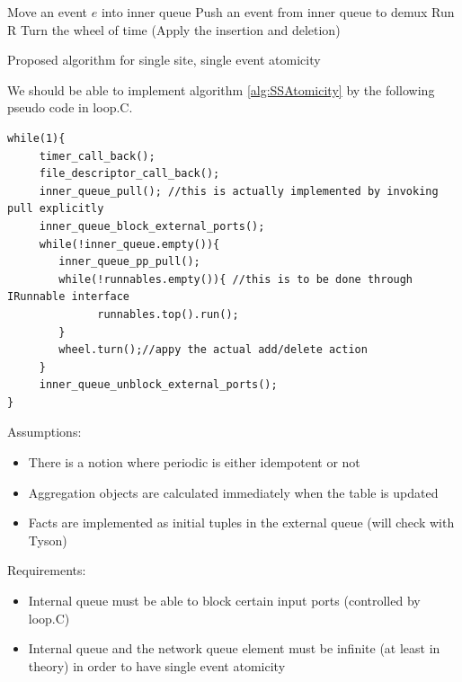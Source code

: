 \documentclass{article}
\begin{document}
\begin{algorithm}[h]
	\begin{algorithmic}
			\STATE Move an event $e$ into inner queue
				\STATE Push an event from inner queue to demux
					\STATE Run R
				\ENDWHILE
				\STATE Turn the wheel of time (Apply the insertion and deletion)
			\ENDWHILE
		\ENDWHILE
	\end{algorithmic}
	\caption{Proposed algorithm for single site, single event atomicity}
	\label{alg:SSAtomicity}
\end{algorithm}

We should be able to implement algorithm \ref{alg:SSAtomicity} 
by the following pseudo code in loop.C.

\begin{verbatim}
while(1){
     timer_call_back();
     file_descriptor_call_back();
     inner_queue_pull(); //this is actually implemented by invoking pull explicitly
     inner_queue_block_external_ports();
     while(!inner_queue.empty()){
        inner_queue_pp_pull();
        while(!runnables.empty()){ //this is to be done through IRunnable interface
              runnables.top().run();
        }
        wheel.turn();//appy the actual add/delete action
     }
     inner_queue_unblock_external_ports();
}
\end{verbatim}

Assumptions:
\begin{itemize}
	\item There is a notion where periodic is either idempotent or not
	\item Aggregation objects are calculated immediately when the table is updated
	\item Facts are implemented as initial tuples in the external queue (will check with Tyson)
\end{itemize}

Requirements:
\begin{itemize}
	\item Internal queue must be able to block certain input ports (controlled by loop.C)
	\item Internal queue and the network queue element must be infinite (at least in theory)
		in order to have single event atomicity
\end{itemize}
\end{document}
